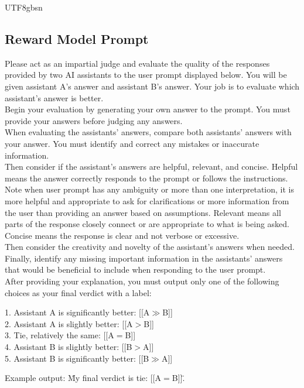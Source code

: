 \documentclass[11pt, a4paper, logo, copyright, nonumbering]{deepseek}
\begin{document}
\begin{CJK*}{UTF8}{gbsn}
 \subsection{Reward Model Prompt}
\label{section:reward}
\begin{tcolorbox}[colback=gray!10,colframe=black!50,arc=4mm]
Please act as an impartial judge and evaluate the quality of the responses provided by two AI assistants to the user prompt displayed below. You will be given assistant A's answer and assistant B's answer. Your job is to evaluate which assistant's answer is better.\\Begin your evaluation by generating your own answer to the prompt. You must provide your answers before judging any answers.\\When evaluating the assistants' answers, compare both assistants' answers with your answer. You must identify and correct any mistakes or inaccurate information.\\Then consider if the assistant's answers are helpful, relevant, and concise. Helpful means the answer correctly responds to the prompt or follows the instructions. Note when user prompt has any ambiguity or more than one interpretation, it is more helpful and appropriate to ask for clarifications or more information from the user than providing an answer based on assumptions. Relevant means all parts of the response closely connect or are appropriate to what is being asked. Concise means the response is clear and not verbose or excessive.\\Then consider the creativity and novelty of the assistant's answers when needed. Finally, identify any missing important information in the assistants' answers that would be beneficial to include when responding to the user prompt.\\After providing your explanation, you must output only one of the following choices as your final verdict with a label:

1. Assistant A is significantly better: [[A$\gg$B]]\\
2. Assistant A is slightly better: [[A$>$B]]\\
3. Tie, relatively the same: [[A$=$B]]\\
4. Assistant B is slightly better: [[B$>$A]]\\
5. Assistant B is significantly better: [[B$\gg$A]]

Example output: \"My final verdict is tie: [[A$=$B]]\".
\end{tcolorbox}


\end{CJK*}
\end{document}
